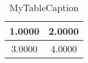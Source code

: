 \documentclass[a4paper,10pt]{article}
\begin{document}
\begin{table}
\centering
\begin{tabular}{|c|c|}
\hline
1.0000 & 2.0000 \\
\hline
3.0000 & 4.0000 \\
\hline
\end{tabular}
\caption{MyTableCaption}
\label{table:MyTableLabel}
\end{table}
\end{document}
